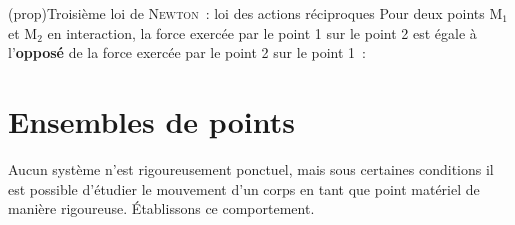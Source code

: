 \documentclass[../../main/main.tex]{subfiles}
\begin{document}
\begin{tcb*}[sidebyside](prop){Troisième loi de \textsc{Newton}~:%
			loi des actions réciproques}
	Pour deux points M$_1$ et M$_2$ en interaction, la force exercée par le point
	1 sur le point 2 est égale à l'\textbf{opposé} de la force exercée par le
	point 2 sur le point 1~:
	\psw{
		\[\boxed{\Ff_{1\ra2} = - \Ff_{2\ra1}}\]
	}
	\tcblower
	\begin{minipage}{0.45\linewidth}
		\begin{center}
		\end{center}
	\end{minipage}
	\hfill
	\begin{minipage}{0.45\linewidth}
		\begin{center}
			\vspace{-15pt}
		\end{center}
	\end{minipage}
\end{tcb*}

\section{Ensembles de points}
Aucun système n'est rigoureusement ponctuel, mais sous certaines conditions il
est possible d'étudier le mouvement d'un corps en tant que point matériel de
manière rigoureuse. Établissons ce comportement.
\end{document}
